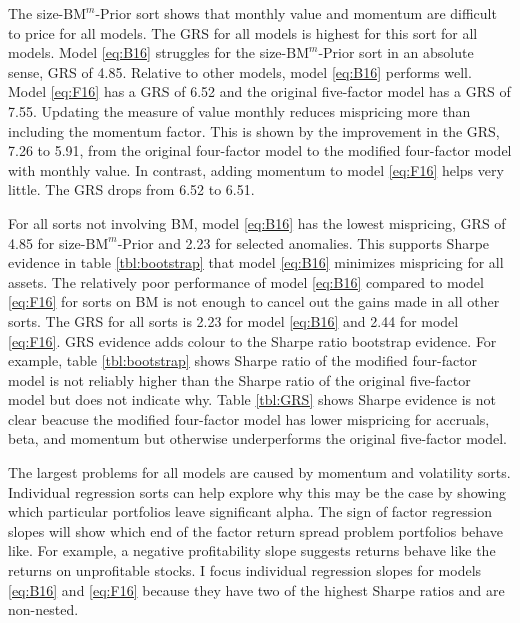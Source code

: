 The size-$\text{BM}^m$-Prior sort shows that monthly value and momentum are
difficult to price for all models.
The GRS for all models is highest for this sort for all models.
Model \ref{eq:B16} struggles for the size-$\text{BM}^m$-Prior sort in an
absolute sense, GRS of 4.85.
Relative to other models, model \ref{eq:B16} performs well.
Model \ref{eq:F16} has a GRS of 6.52 and the original five-factor model has
a GRS of 7.55.
Updating the measure of value monthly reduces mispricing more than including
the momentum factor.
This is shown by the improvement in the GRS, 7.26 to 5.91, from the original
four-factor model to the modified four-factor model with monthly value.
In contrast, adding momentum to model \ref{eq:F16} helps very little.
The GRS drops from 6.52 to 6.51.

For all sorts not involving BM, model \ref{eq:B16} has the lowest mispricing,
GRS of 4.85 for size-$\text{BM}^m$-Prior and 2.23 for selected anomalies.
This supports Sharpe evidence in table \ref{tbl:bootstrap} that model \ref{eq:B16}
minimizes mispricing for all assets.
The relatively poor performance of model \ref{eq:B16} compared to model \ref{eq:F16}
for sorts on BM is not enough to cancel out the gains made in all other sorts.
The GRS for all sorts is 2.23 for model \ref{eq:B16} and 2.44 for model \ref{eq:F16}.
GRS evidence adds colour to the Sharpe ratio bootstrap evidence.
For example, table \ref{tbl:bootstrap} shows Sharpe ratio of the modified
four-factor model is not reliably higher than the Sharpe ratio of the
original five-factor model but does not indicate why.
Table \ref{tbl:GRS} shows Sharpe evidence is not clear beacuse the modified
four-factor model has lower mispricing for accruals, beta, and momentum but
otherwise underperforms the original five-factor model.

The largest problems for all models are caused by momentum and volatility
sorts.
Individual regression sorts can help explore why this may be the case by
showing which particular portfolios leave significant alpha.
The sign of factor regression slopes will show which end of the factor return
spread problem portfolios behave like.
For example, a negative profitability slope suggests returns behave
like the returns on unprofitable stocks.
I focus individual regression slopes for models \ref{eq:B16} and \ref{eq:F16}
because they have two of the highest Sharpe ratios and are non-nested.
